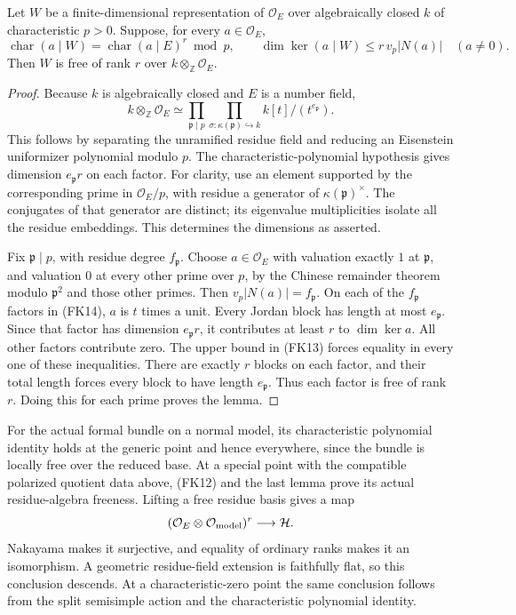 \begin{srlemma}
\label{lem:sr-residue-norm-freeness}
Let \(W\) be a finite-dimensional representation of
\(\mathcal O_E\) over algebraically closed \(k\) of characteristic
\(p>0\).  Suppose, for every \(a\in\mathcal O_E\),
\[
 \operatorname{char}(a\mid W)
           =\operatorname{char}(a\mid E)^r\bmod p,\qquad
             \dim\ker(a\mid W)\le r\,v_p|N(a)|\quad(a\ne0).
 \tag{FK13}
\]
Then \(W\) is free of rank \(r\) over
\(k\otimes_{\mathbb Z}\mathcal O_E\).
\end{srlemma}
\begin{proof}
Because \(k\) is algebraically closed and \(E\) is a number field,
\[
 k\otimes_{\mathbb Z}\mathcal O_E
   \simeq\prod_{\mathfrak p\mid p}
          \prod_{\sigma:\kappa(\mathfrak p)\hookrightarrow k}
                                          k[t]/(t^{e_{\mathfrak p}}).
 \tag{FK14}
\]
This follows by separating the unramified residue field and
reducing an Eisenstein uniformizer polynomial modulo \(p\).
The characteristic-polynomial hypothesis gives dimension
\(e_{\mathfrak p}r\) on each factor.
For clarity, use an element supported by the corresponding
prime in \(\mathcal O_E/p\), with residue a generator of
\(\kappa(\mathfrak p)^\times\).
The conjugates of that generator are distinct; its eigenvalue
multiplicities isolate all the residue embeddings.
This determines the dimensions as asserted.

Fix \(\mathfrak p\mid p\), with residue degree \(f_{\mathfrak p}\).
Choose \(a\in\mathcal O_E\) with valuation exactly \(1\)
at \(\mathfrak p\), and valuation \(0\) at every other
prime over \(p\), by the Chinese remainder theorem
modulo \(\mathfrak p^2\) and those other primes.
Then \(v_p|N(a)|=f_{\mathfrak p}\).
On each of the \(f_{\mathfrak p}\) factors in (FK14),
\(a\) is \(t\) times a unit.
Every Jordan block has length at most \(e_{\mathfrak p}\).
Since that factor has dimension \(e_{\mathfrak p}r\),
it contributes at least \(r\) to \(\dim\ker a\).
All other factors contribute zero.
The upper bound in (FK13) forces equality in every one
of these inequalities.  There are exactly \(r\) blocks
on each factor, and their total length forces every block
to have length \(e_{\mathfrak p}\).
Thus each factor is free of rank \(r\).
Doing this for each prime proves the lemma.
\end{proof}

For the actual formal bundle on a normal model, its characteristic
polynomial identity holds at the generic point and hence
everywhere, since the bundle is locally free over the reduced base.
At a special point with the compatible polarized quotient data
above, (FK12) and the last lemma prove its actual residue-algebra
freeness.  Lifting a free residue basis gives a map
\[
 (\mathcal O_E\otimes\mathcal O_{\rm model})^r\longrightarrow\mathcal H.
\]
Nakayama makes it surjective, and equality of ordinary ranks
makes it an isomorphism.  A geometric residue-field extension
is faithfully flat, so this conclusion descends.
At a characteristic-zero point the same conclusion follows
from the split semisimple action and the characteristic
polynomial identity.

